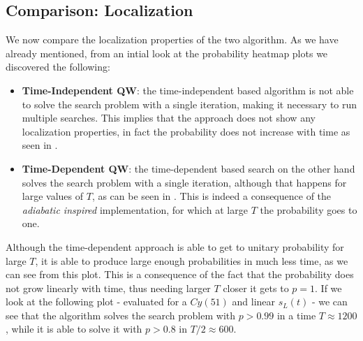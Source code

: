    \clearpage
    \subsection{Comparison: Localization}\label{subsec:localization_results}
        We now compare the localization properties of the two algorithm. As we have already mentioned, from an intial look at the probability heatmap plots we discovered the following:
        \begin{itemize}
            \item \textbf{Time-Independent QW}: the time-independent based algorithm is not able to solve the search problem with a single iteration, making it necessary to run multiple searches. This implies that the approach does not show any localization properties, in fact the probability does not increase with time as seen in .
            \item \textbf{Time-Dependent QW}: the time-dependent based search on the other hand solves the search problem with a single iteration, although that happens for large values of $T$, as can be seen in . This is indeed a consequence of the \textit{adiabatic inspired} implementation, for which at large $T$ the probability goes to one.
        \end{itemize}
        

        \clearpage
        \noindent
        Although the time-dependent approach is able to get to unitary probability for large $T$, it is able to produce large enough probabilities in much less time, as we can see from this plot. This is a consequence of the fact that the probability does not grow linearly with time, thus needing larger $T$ closer it gets to $p=1$. If we look at the following plot - evaluated for a $Cy(51)$ and linear $s_L(t)$ - we can see that the algorithm solves the search problem with $p>0.99$ in a time $T\approx 1200$, while it is able to solve it with $p>0.8$ in $T/2 \approx 600$.
        

        \clearpage
